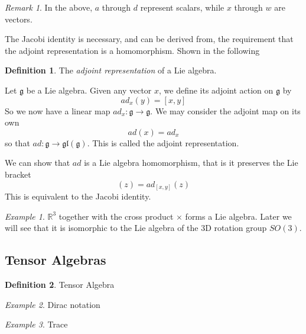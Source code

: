 \documentclass[12pt]{article}
\theoremstyle{definition}
\newtheorem{definition}{Definition}[section]
\theoremstyle{remark}
\newtheorem*{remark}{Remark}
\theoremstyle{example}
\newtheorem{example}{Example}
\begin{document}
\begin{remark}
	In the above, $a$ through $d$ represent scalars, while $x$ through $w$ are vectors.
	
	The Jacobi identity is necessary, and can be derived from, the requirement that the adjoint representation is a homomorphism. Shown in the following
\end{remark}

\begin{definition}
	The \textit{adjoint representation} of a Lie algebra.
	
	Let $\mathfrak{g}$ be a Lie algebra. Given any vector $x$, we define its adjoint action on $\mathfrak{g}$ by
	\begin{equation}
		ad_{x}(y)=[x,y]
	\end{equation}
	So we now have a linear map $ad_x:\mathfrak{g}\to\mathfrak{g}$. We may consider the adjoint map on its own
	\begin{equation}
		ad(x)=ad_x
	\end{equation}
	so that $ad:\mathfrak{g}\to\mathfrak{gl}(\mathfrak{g})$. This is called the adjoint representation.
	
	We can show that $ad$ is a Lie algebra homomorphism, that is it preserves the Lie bracket
	\begin{equation}
		[ad_x,ad_y](z)=ad_{[x,y]}(z)
	\end{equation}
	This is equivalent to the Jacobi identity.
\end{definition}

\begin{example}
	$\mathbb{R}^3$ together with the cross product $\times$ forms a Lie algebra. Later we will see that it is isomorphic to the Lie algebra of the 3D rotation group $SO(3)$.
\end{example}

\subsection{Tensor Algebras}

\begin{definition}
	Tensor Algebra
\end{definition}

\begin{example}
	Dirac notation
\end{example}

\begin{example}
	Trace
\end{example}
\end{document}
